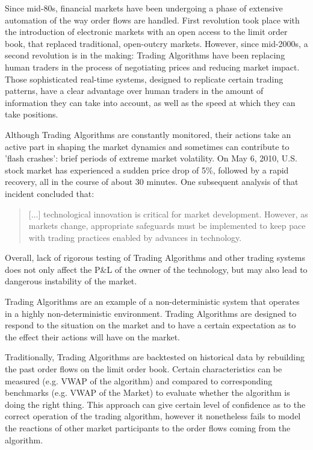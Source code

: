 Since mid-80s, financial markets have been undergoing a phase of extensive automation of the way order flows are handled. First revolution took place with the introduction of electronic markets with an open access to the limit order book, that replaced traditional, open-outcry markets. However, since mid-2000s, a second revolution is in the making: Trading Algorithms have been replacing human traders in the process of negotiating prices and reducing market impact. Those sophisticated real-time systems, designed to replicate certain trading patterns, have a clear advantage over human traders in the amount of information they can take into account, as well as the speed at which they can take positions. \cite{Lenglet}

Although Trading Algorithms are constantly monitored, their actions take an active part in shaping the market dynamics and sometimes can contribute to 'flash crashes': brief periods of extreme market volatility. On May 6, 2010, U.S. stock market has experienced a sudden price drop of 5\%, followed by a rapid recovery, all in the course of about 30 minutes. One subsequent analysis of that incident concluded that:
\begin{quote}
[$\ldots$] technological innovation is critical for market development. However, as markets change, appropriate safeguards must be implemented to keep pace with trading practices enabled by advances in technology.\cite{Kirilenko2011}
\end{quote}
Overall, lack of rigorous testing of Trading Algorithms and other trading systems does not only affect the P\&L  of the owner of the technology, but may also lead to dangerous instability of the market.

Trading Algorithms are an example of a non-deterministic system that operates in a highly non-deterministic environment. Trading Algorithms are designed to respond to the situation on the market and to have a certain expectation as to the effect their actions will have on the market.

Traditionally, Trading Algorithms are backtested on historical data by rebuilding the past order flows on the limit order book. Certain characteristics can be measured (e.g. VWAP of the algorithm) and compared to corresponding benchmarks (e.g. VWAP of the Market) to evaluate whether the algorithm is doing the right thing. This approach can give certain level of confidence as to the correct operation of the trading algorithm, however it nonetheless fails to model the reactions of other market participants to the order flows coming from the algorithm. \cite{Coggins2006}

